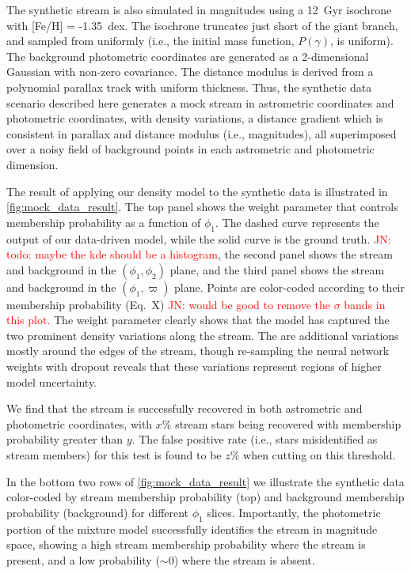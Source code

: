 \documentclass[twocolumn]{aastex631}
\newcommand{\JN}[1]{{\textcolor{red}{JN: #1}}}
\begin{document}
        The synthetic stream is also simulated in magnitudes using a 12~Gyr isochrone with [Fe/H] = -1.35~dex. The isochrone truncates just short of the giant branch, and sampled from uniformly (i.e., the initial mass function, $P(\gamma)$, is uniform). The background photometric coordinates are generated as a 2-dimensional Gaussian with non-zero covariance. The distance modulus is derived from a polynomial parallax track with uniform thickness. Thus, the synthetic data scenario described here generates a mock stream in astrometric coordinates and photometric coordinates, with density variations, a distance gradient which is consistent in parallax and distance modulus (i.e., magnitudes), all superimposed over a noisy field of background points in each astrometric and photometric dimension.
    
        The result of applying our density model to the synthetic data is illustrated in \autoref{fig:mock_data_result}. The top panel shows the weight parameter that controls membership probability as a function of $\phi_1$. The dashed curve represents the output of our data-driven model, while the solid curve is the ground truth. \JN{todo: maybe the kde should be a histogram}, the second panel shows the stream and background in the $(\phi_1,\phi_2)$ plane, and the third panel shows the stream and background in the $(\phi_1,\varpi)$ plane. Points are color-coded according to their membership probability (Eq.~X) \JN{would be good to remove the $\sigma$ bands in this plot.} The weight parameter clearly shows that the model has captured the two prominent density variations along the stream. The are additional variations  mostly around the edges of the stream, though re-sampling the neural network weights with dropout reveals that these variations represent regions of higher model uncertainty. 
        
        We find that the stream is successfully recovered in both astrometric and photometric coordinates, with $x\%$ stream stars being recovered with membership probability greater than $y$. The false positive rate (i.e., stars misidentified as stream members) for this test is found to be $z\%$ when cutting on this threshold. 
    
        In the bottom two rows of \autoref{fig:mock_data_result} we illustrate the synthetic data color-coded by stream membership probability (top) and background membership probability (background) for different $\phi_1$ slices. Importantly, the photometric portion of the mixture model successfully identifies the stream in magnitude space, showing a high stream membership probability where the stream is present, and a low probability ($\sim 0$) where the stream is absent.  
    
\end{document}
